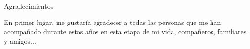 \newpage
\thispagestyle{empty}

{ \flushright

\begin{LARGE}
Agradecimientos
\end{LARGE}

\hspace{3mm}

\begin{large}
En primer lugar, me gustaría agradecer a todas las personas que me han acompañado durante estos años en esta etapa de mi vida, compañeros, familiares y amigos...
\par

\end{large}

}